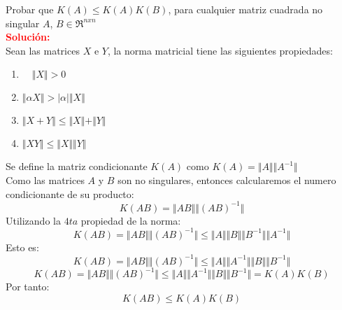 Probar que $K(A) \leq  K(A)K(B)$, para cualquier matriz cuadrada no singular $A$, $B \in \Re^{nxn}$\\

\noindent \textcolor{red}{\bf Solución:}\\
      Sean las matrices $X$ e $Y$, la norma matricial tiene las siguientes propiedades:
      \begin{enumerate}
          \item  $\quad \Vert{X}\Vert > 0$
      \item 
        \quad $\Vert{\alpha X}\Vert > \vert{\alpha}\vert \Vert{X}\Vert$
      
      \item 
          \quad $\Vert{X + Y}\Vert \leq \Vert{X}\Vert + \Vert{Y}\Vert$
       
     \item  
         \quad $\Vert{XY}\Vert \leq \Vert{X}\Vert \Vert{Y}\Vert$
      
      \end{enumerate}
      
      

      Se define la matriz condicionante $K(A)$ como $K(A) = \Vert{A}\Vert \Vert{A^{-1}}\Vert$\\
      Como las matrices $A$ y $B$ son no singulares, entonces calcularemos el numero condicionante de su producto:
      \[
          K(AB) =  \Vert{AB}\Vert \Vert{(AB)^{-1}}\Vert 
      \]
      Utilizando la $4ta$ propiedad de la norma:\\
      \[
        K(AB) =  \Vert{AB}\Vert \Vert{(AB)^{-1}}\Vert \leq \Vert{A}\Vert \Vert{B}\Vert \Vert{B^{-1}}\Vert \Vert{A^{-1}}\Vert
      \]
      Esto es:
      \[
        K(AB) =  \Vert{AB}\Vert \Vert{(AB)^{-1}}\Vert \leq \Vert{A}\Vert \Vert{A^{-1}}\Vert \Vert{B}\Vert \Vert{B^{-1}}\Vert 
      \]
      \[
        K(AB) =  \Vert{AB}\Vert \Vert{(AB)^{-1}}\Vert \leq \Vert{A}\Vert \Vert{A^{-1}}\Vert \Vert{B}\Vert \Vert{B^{-1}}\Vert = K(A)K(B)
      \]
      Por tanto:
      \[
        K(AB) \leq K(A)K(B)
      \]